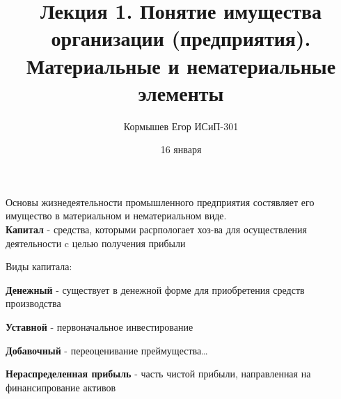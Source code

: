 \documentclass[11pt]{article}
\author{Кормышев Егор ИСиП-301}
\date{16 января}
\title{Лекция 1. Понятие имущества организации (предприятия). Материальные и нематериальные элементы}
\begin{document}
\maketitle
\tableofcontents

Основы жизнедеятельности промышленного предприятия  состявляет его имущество в материальном и нематериальном виде. \\[0pt]

\textbf{Капитал} -  средства, которыми расрпологает хоз-ва для осуществления деятельности c целью получения прибыли        

\begin{center}
Виды капитала:
\end{center}

\textbf{Денежный} - существует в денежной форме для приобретения средств производства

\textbf{Уставной} - первоначальное инвестирование

\textbf{Добавочный} - переоценивание преймущества\ldots{}

\textbf{Нераспределенная прибыль} - часть чистой прибыли, направленная на финансипрование активов 
\end{document}
